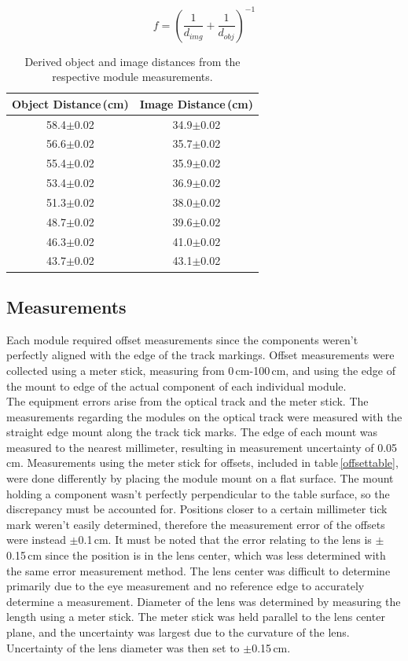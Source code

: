 \documentclass[twocolumn]{aastex6}
\begin{document}
\begin{equation}
f=\left(\frac{1}{d_{img}}+\frac{1}{d_{obj}}\right)^{-1}
\label{focaldistance}
\end{equation}


\begin{table}[h]
\begin{center}
\caption{Derived object and image distances from the respective module measurements.}
\begin{tabular}{ c | c }
Object Distance\,(cm) & Image Distance\,(cm) \\ \hline \hline
58.4$\pm$0.02 & 34.9$\pm$0.02 \\
56.6$\pm$0.02 & 35.7$\pm$0.02  \\ 
55.4$\pm$0.02 & 35.9$\pm$0.02  \\  
53.4$\pm$0.02 & 36.9$\pm$0.02  \\ 
51.3$\pm$0.02 & 38.0$\pm$0.02  \\ 
48.7$\pm$0.02 & 39.6$\pm$0.02  \\ 
46.3$\pm$0.02 & 41.0$\pm$0.02  \\ 
43.7$\pm$0.02 & 43.1$\pm$0.02  \\ 
\end{tabular}
\label{objimgtable}
\end{center}
\end{table}

\subsection{Measurements}
Each module required offset measurements since the components weren't  perfectly aligned with the edge of the track markings. Offset measurements were collected using a meter stick, measuring from 0\,cm-100\,cm, and using the edge of the mount to edge of the actual component of each individual module. 
\\
\indent The equipment errors arise from the optical track and the meter stick. The measurements regarding the modules on the optical track were measured with the straight edge mount along the track tick marks. The edge of each mount was measured to the nearest millimeter, resulting in measurement uncertainty of 0.05\,cm. Measurements using the meter stick for offsets, included in table\,\ref{offsettable}, were done differently by placing the module mount on a flat surface. The mount holding a component wasn't perfectly perpendicular to the table surface, so the discrepancy must be accounted for. Positions closer to a certain millimeter tick mark weren't easily determined, therefore the measurement error of the offsets were instead $\pm$0.1\,cm. It must be noted that the error relating to the lens is $\pm$0.15\,cm since the position is in the lens center, which was less determined with the same error measurement method. The lens center was difficult to determine primarily due to the eye measurement and no reference edge to accurately determine a measurement. Diameter of the lens was determined by measuring the length using a meter stick. The meter stick was held parallel to the lens center plane, and the uncertainty was largest due to the curvature of the lens. Uncertainty of the lens diameter was then set to $\pm$0.15\,cm.
\end{document}
